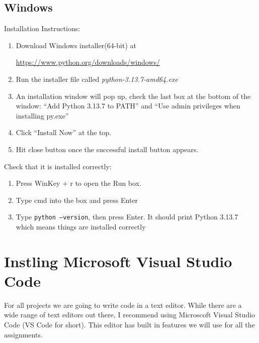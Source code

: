 \documentclass[12pt]{article}
\begin{document}
\subsection{Windows}
Installation Instructions: 
\begin{enumerate}
\item Download Windows installer(64-bit) at

  \url{https://www.python.org/downloads/windows/}

\item Run the installer file called \textit{python-3.13.7-amd64.exe}
\item An installation window will pop up, check the last box at the bottom of the window: ``Add Python 3.13.7 to PATH'' and ``Use admin privileges when installing py.exe''
\item Click ``Install Now'' at the top.
  \item Hit close button once the successful install button appears.
\end{enumerate}

Check that it is installed correctly: 
\begin{enumerate}
\item Press WinKey + r to open the Run box.
\item Type cmd into the box and press Enter
  \item Type \texttt{python --version}, then press Enter. It should print Python 3.13.7 which means things are installed correctly
\end{enumerate}


\section{Instling Microsoft Visual Studio Code}
For all projects we are going to write code in a text editor. While there are a wide range of text editors out there, I recommend using Microscoft Visual Studio Code (VS Code for short).
This editor has built in features we will use for all the assignments.
\end{document}
